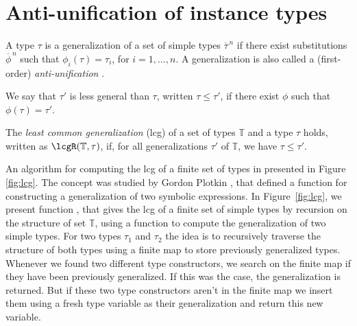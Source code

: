 \section{Anti-unification of instance types}
\label{sec:anti-unif}

A type $\tau$ is a generalization of a set of simple types
$\overline{\tau}^{\,n}$ if there exist substitutions
$\overline{\phi}^{\,n}$ such that $\phi_i(\tau)=\tau_i$, for
$i=1,\ldots,n$. A generalization is also called a (first-order) {\em
  anti-unification\/} \cite{ModelTheory2012}.

We say that $\tau'$ is less general than $\tau$, written $\tau \leq
\tau'$, if there exist $\phi$ such that $\phi(\tau) = \tau'$.

The {\it least common generalization} (lcg) of a set of types
$\mathbb{T}$ and a type $\tau$ holds, written as
$\lcgR(\mathbb{T},\tau)$, if, for all generalizations $\tau'$ of
$\mathbb{T}$, we have $\tau \leq \tau'$.

An algorithm for computing the lcg of a finite set of types in
presented in Figure \ref{fig:lcg}. The concept was studied by Gordon
Plotkin \cite{plotkin1970note,plotkin1971further}, that defined a
function for constructing a generalization of two symbolic
expressions.  In Figure~\ref{fig:lcg}, we present function \lcg, that
gives the lcg of a finite set of simple types by recursion on the
structure of set $\mathbb{T}$, using a function to compute the
generalization of two simple types. For two types $\tau_1$ and
$\tau_2$ the idea is to recursively traverse the structure of both
types using a finite map to store previously generalized
types. Whenever we found two different type constructors, we search on
the finite map if they have been previously generalized. If this was
the case, the generalization is returned. But if these two type
constructors aren't in the finite map we insert them using a fresh
type variable as their generalization and return this new variable.

